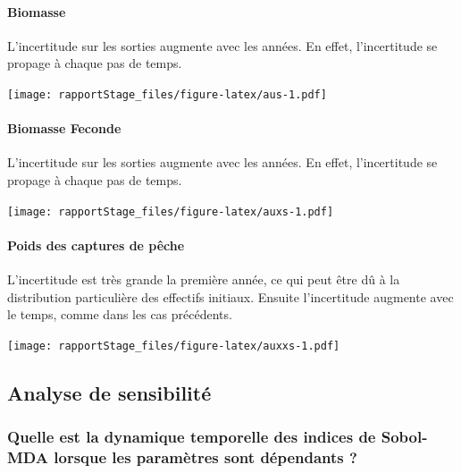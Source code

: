 \documentclass[
]{article}
\begin{document}
\hypertarget{biomasse-6}{%
\paragraph{Biomasse}\label{biomasse-6}}

L'incertitude sur les sorties augmente avec les années. En effet,
l'incertitude se propage à chaque pas de temps.

\texttt{[image: rapportStage\_files/figure-latex/aus-1.pdf]}

\hypertarget{biomasse-feconde-5}{%
\paragraph{Biomasse Feconde}\label{biomasse-feconde-5}}

L'incertitude sur les sorties augmente avec les années. En effet,
l'incertitude se propage à chaque pas de temps.

\texttt{[image: rapportStage\_files/figure-latex/auxs-1.pdf]}

\hypertarget{poids-des-captures-de-puxeache-1}{%
\paragraph{Poids des captures de
pêche}\label{poids-des-captures-de-puxeache-1}}

L'incertitude est très grande la première année, ce qui peut être dû à
la distribution particulière des effectifs initiaux. Ensuite
l'incertitude augmente avec le temps, comme dans les cas précédents.

\texttt{[image: rapportStage\_files/figure-latex/auxxs-1.pdf]}

\hypertarget{analyse-de-sensibilituxe9}{%
\subsection{Analyse de sensibilité}\label{analyse-de-sensibilituxe9}}

\hypertarget{quelle-est-la-dynamique-temporelle-des-indices-de-sobol-mda-lorsque-les-paramuxe8tres-sont-duxe9pendants}{%
\subsubsection{Quelle est la dynamique temporelle des indices de
Sobol-MDA lorsque les paramètres sont dépendants
?}\label{quelle-est-la-dynamique-temporelle-des-indices-de-sobol-mda-lorsque-les-paramuxe8tres-sont-duxe9pendants}}
\end{document}
